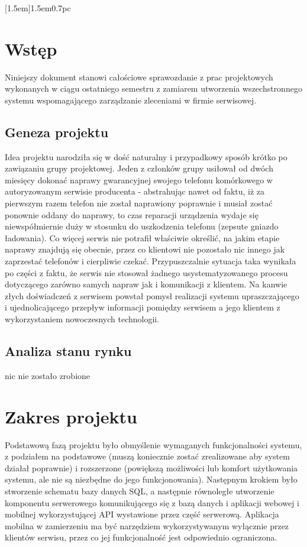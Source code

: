 \documentclass[a4paper,11pt]{article}
\begin{document}
\newpage
\maketitle
\newpage

[1.5em]{\addvspace{1pc}\bfseries}{1.5em}{0.7pc}

\renewcommand\lstlistingname{Listing}
\renewcommand\lstlistlistingname{Spis listingów}

\tableofcontents

\newpage

\makeatother

\section{Wstęp}
Niniejszy dokument stanowi całościowe sprawozdanie z prac projektowych wykonanych w ciągu ostatniego semestru z zamiarem utworzenia wszechstronnego systemu wspomagającego zarządzanie zleceniami w firmie serwisowej.
\subsection{Geneza projektu}
Idea projektu narodziła się w dość naturalny i przypadkowy sposób krótko po zawiązaniu grupy projektowej. Jeden z członków grupy usiłował od dwóch miesięcy dokonać naprawy gwarancyjnej swojego telefonu komórkowego w autoryzowanym serwisie producenta - abstrahując nawet od faktu, iż za pierwszym razem telefon nie został naprawiony poprawnie i musiał zostać ponownie oddany do naprawy, to czas reparacji urządzenia wydaje się niewspółmiernie duży w stosunku do uszkodzenia telefonu (zepsute gniazdo ładowania). Co więcej serwis nie potrafił właściwie określić, na jakim etapie naprawy znajdują się obecnie, przez co klientowi nie pozostało nic innego jak zaprzestać telefonów i cierpliwie czekać. Przypuszczalnie sytuacja taka wynikała po części z faktu, że serwis nie stosował żadnego usystematyzowanego procesu dotyczącego zarówno samych napraw jak i komunikacji z klientem. Na kanwie złych doświadczeń z serwisem powstał pomysł realizacji systemu upraszczającego i ujednolicającego przepływ informacji pomiędzy serwisem a jego klientem z wykorzystaniem nowoczesnych technologii.
\subsection{Analiza stanu rynku}
nic nie zostało zrobione
\section{Zakres projektu}
Podstawową fazą projektu było obmyślenie wymaganych funkcjonalności systemu, z podziałem na podstawowe (muszą koniecznie zostać zrealizowane aby system działał poprawnie) i rozszerzone (powiększą możliwości lub komfort użytkowania systemu, ale nie są niezbędne do jego funkcjonowania). Następnym krokiem było stworzenie schematu bazy danych SQL, a następnie równoległe utworzenie komponentu serwerowego komunikującego się z bazą danych i aplikacji webowej i mobilnej wykorzystującej API wystawione przez część serwerową. Aplikacja mobilna w zamierzeniu ma być narzędziem wykorzystywanym wyłącznie przez klientów serwisu, przez co jej funkcjonalność jest odpowiednio ograniczona.
\end{document}
